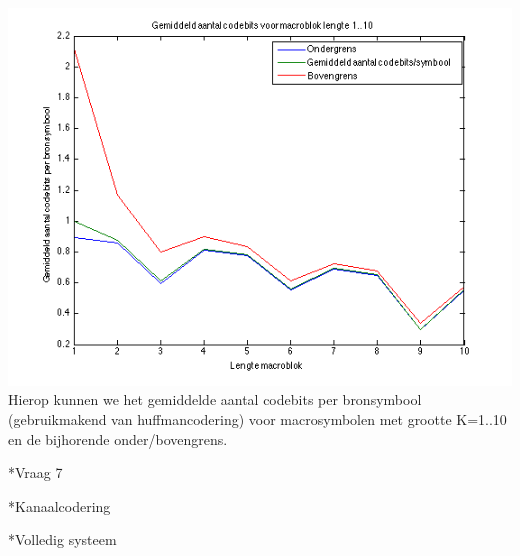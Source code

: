 \documentclass[]{article}
\begin{document}
\begin{section}
\begin{subsection}
       \includegraphics[scale=0.75]{vraag1_4.png} \\
		Hierop kunnen we het gemiddelde aantal codebits per bronsymbool (gebruikmakend van huffmancodering) voor macrosymbolen met grootte K=1..10 en de bijhorende onder/bovengrens.
		
		\end{subsection}

      	\begin{subsection}*{Vraag 7}
   	\end{subsection}

\end{section}
\begin{section}*{Kanaalcodering}
\end{section}
\begin{section}*{Volledig systeem}
\end{section}
\end{document}
